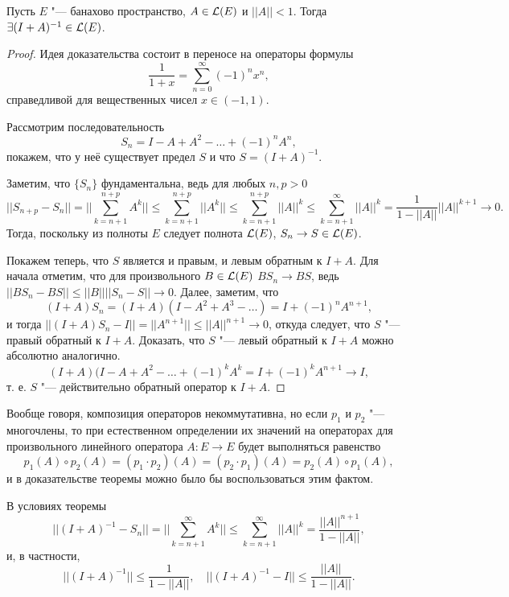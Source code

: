 \documentclass[main]{subfiles}
\begin{document}
\begin{theorem}\label{thm:inverse-neumann}
  Пусть \( E \) "--- банахово пространство,
  \( A \in \Linears{E} \) и \( ||A|| < 1 \).
  Тогда \( \exists (I + A)^{-1} \in \Linears{E} \).
\end{theorem}
\begin{proof}
  Идея доказательства состоит
  в переносе на операторы формулы
  \[
    \frac{1}{1 + x} = \sum_{n=0}^\infty {(-1)}^n x^n,
  \]
  справедливой для вещественных чисел \( x \in (-1, 1) \).

  Рассмотрим последовательность
  \[
    S_n = I - A + A^2 - \ldots + {(-1)}^n A^n,
  \]
  покажем, что у неё существует предел \( S \)
  и что \( S = {(I + A)}^{-1} \).

  Заметим, что \( \{ S_n \} \) фундаментальна,
  ведь для любых \( n, p > 0 \)
  \[
    ||S_{n + p} - S_n|| =
    ||\sum_{k = n + 1}^{n + p} A^k|| \le
    \sum_{k = n + 1}^{n + p} ||A^k|| \le
    \sum_{k = n + 1}^{n + p} ||A||^k \le
    \sum_{k = n + 1}^{\infty} ||A||^k =
    \frac{1}{1 - ||A||} ||A||^{k+1} \to 0.
  \]
  Тогда, поскольку из полноты \( E \) следует
  полнота \( \Linears{E} \),
  \( S_n \to S \in \Linears{E} \).

  Покажем теперь, что \( S \)
  является и правым, и левым обратным к \( I + A \).
  Для начала отметим, что для произвольного
  \( B \in \Linears{E} \) \( B S_n \to B S \),
  ведь \( ||B S_n - B S|| \le ||B|| ||S_n - S|| \to 0 \).
  Далее, заметим, что
  \[
    (I + A) S_n = (I + A)(I - A^2 + A^3 - \ldots) =
    I + {(-1)}^n A^{n+1},
  \]
  и тогда \( ||(I + A) S_n - I|| = ||A^{n+1}|| \le ||A||^{n+1} \to 0 \),
  откуда следует, что \( S \) "--- правый обратный к \( I + A \).
  Доказать, что \( S \) "--- левый обратный к \( I + A \)
  можно абсолютно аналогично.
  \[ (I + A)(I - A + A^2 - \dots + (-1)^k A^k =
  I + (-1)^k A^{n + 1} \to I, \]
  т. е. \( S \) "--- действительно обратный оператор к \( I + A \).
\end{proof}
\begin{remark}
  Вообще говоря, композиция операторов
  некоммутативна,
  но если \( p_1 \) и \( p_2 \) "--- многочлены,
  то при естественном определении их значений
  на операторах для произвольного
  линейного оператора \( A : E \to E \) будет выполняться
  равенство
  \[
    p_1(A) \circ p_2(A) = (p_1 \cdot p_2)(A) =
    (p_2 \cdot p_1)(A) = p_2(A) \circ p_1(A),
  \]
  и в доказательстве теоремы можно
  было бы воспользоваться этим фактом.
\end{remark}

\begin{corollary}
  В условиях теоремы
  \[ ||(I + A)^{-1} - S_n|| = ||\sum_{k = n + 1}^\infty A^k|| \le
  \sum_{k = n+1}^\infty ||A||^k = \frac{||A||^{n+1}}{1 - ||A||}, \]
  и, в частности,
  \[
    ||(I + A)^{-1}|| \le \frac{1}{1 - ||A||}, \quad
    ||(I + A)^{-1} - I|| \le \frac{||A||}{1 - ||A||}.
  \]
\end{corollary}
\end{document}
